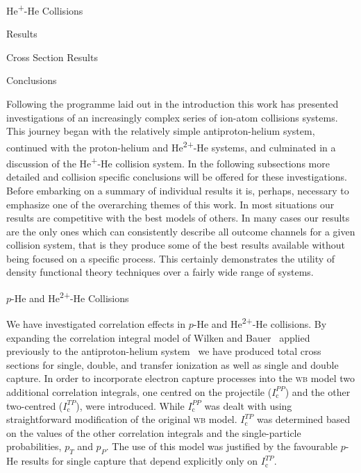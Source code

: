 \documentclass[a5paper, 9 pt]{extreport}
\begin{document}
\begin{chapter}{\texorpdfstring{He\textsuperscript{+}}{He+}-He Collisions \label{chap:hephe}}
\begin{section}{Results \label{sec:hephe-disc}}
\begin{subsection}{Cross Section Results \label{sec:hephe-res}}
      \end{subsection}

   \end{section}

\end{chapter}

\begin{chapter}{Conclusions \label{chap:con}}

   Following the programme laid out in the introduction this work has presented investigations of an
   increasingly complex series of ion-atom collisions systems. This journey began with the relatively
   simple antiproton-helium system, continued with the proton-helium and He\textsuperscript{2+}-He
   systems, and culminated in a discussion of the He\textsuperscript{+}-He collision system. In the
   following subsections more detailed and collision specific conclusions will be offered for these
   investigations. Before embarking on a summary of individual results it is, perhaps, necessary to
   emphasize one of the overarching themes of this work. In most situations our results are competitive
   with the best models of others. In many cases our results are the only ones which can consistently
   describe all outcome channels for a given collision system, that is they produce some of the best
   results available without being focused on a specific process. This certainly demonstrates the
   utility of density functional theory techniques over a fairly wide range of systems.

   \begin{section}{\texorpdfstring{$p$}{p}-He and \texorpdfstring{He\textsuperscript{2+}}{He2+}-He
                   Collisions \label{sec:con-phe2p-he}}

      We have investigated correlation effects in $p$-He and He\textsuperscript{2+}-He collisions. By
      expanding the correlation integral model of Wilken and Bauer~\cite{wb} applied previously to the
      antiproton-helium system~\cite{pbarhe} we have produced total cross sections for single, double,
      and transfer ionization as well as single and double capture. In order to incorporate electron
      capture processes into the \textsc{wb} model two additional correlation integrals, one centred on
      the projectile ($I^{PP}_\mathrm{c}$) and the other two-centred ($I^{TP}_\mathrm{c}$), were
      introduced. While $I^{PP}_\mathrm{c}$ was dealt with using straightforward modification of the
      original \textsc{wb} model. $I^{TP}_\mathrm{c}$ was determined based on the values of the other
      correlation integrals and the single-particle probabilities, $p_T$ and $p_P$. The use of this
      model was justified by the favourable $p$-He results for single capture that depend explicitly
      only on $I^{TP}_\mathrm{c}$.


\end{section}
\end{chapter}
\end{document}
